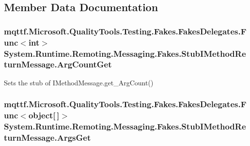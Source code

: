 \subsection{Member Data Documentation}
\hypertarget{class_system_1_1_runtime_1_1_remoting_1_1_messaging_1_1_fakes_1_1_stub_i_method_return_message_afabeab720ac2516806503c2240a7461c}{
\subsubsection[{Arg\-Count\-Get}]{\setlength{\rightskip}{0pt plus 5cm}mqttf.\-Microsoft.\-Quality\-Tools.\-Testing.\-Fakes.\-Fakes\-Delegates.\-Func$<$int$>$ System.\-Runtime.\-Remoting.\-Messaging.\-Fakes.\-Stub\-I\-Method\-Return\-Message.\-Arg\-Count\-Get}}\label{class_system_1_1_runtime_1_1_remoting_1_1_messaging_1_1_fakes_1_1_stub_i_method_return_message_afabeab720ac2516806503c2240a7461c}


Sets the stub of I\-Method\-Message.\-get\-\_\-\-Arg\-Count()

\hypertarget{class_system_1_1_runtime_1_1_remoting_1_1_messaging_1_1_fakes_1_1_stub_i_method_return_message_a504822d5712f098a94748973b98b7b22}{
\subsubsection[{Args\-Get}]{\setlength{\rightskip}{0pt plus 5cm}mqttf.\-Microsoft.\-Quality\-Tools.\-Testing.\-Fakes.\-Fakes\-Delegates.\-Func$<$object\mbox{[}$\,$\mbox{]}$>$ System.\-Runtime.\-Remoting.\-Messaging.\-Fakes.\-Stub\-I\-Method\-Return\-Message.\-Args\-Get}}\label{class_system_1_1_runtime_1_1_remoting_1_1_messaging_1_1_fakes_1_1_stub_i_method_return_message_a504822d5712f098a94748973b98b7b22}


